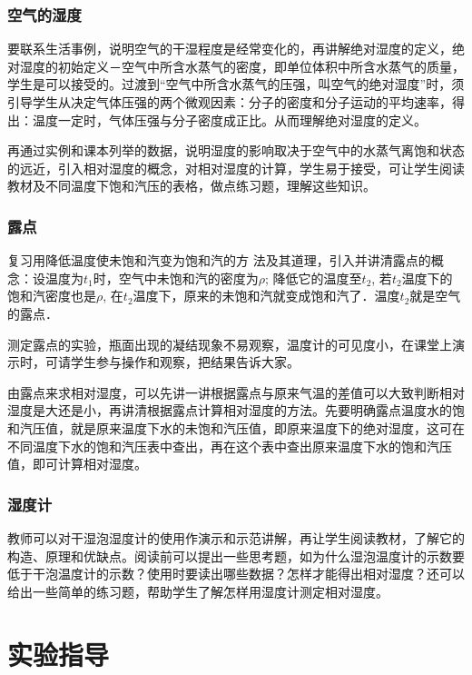 \subsubsection{空气的湿度}

要联系生活事例，说明空气的干湿程度是经常变化的，再讲解绝对湿度的定义，绝对湿度的初始定义－空气中所含水蒸气的密度，即单位体积中所含水蒸气的质量，学生是可以接受的。过渡到“空气中所含水蒸气的压强，叫空气的绝对湿度”时，须引导学生从决定气体压强的两个微观因素：分子的密度和分子运动的平均速率，得出：温度一定时，气体压强与分子密度成正比。从而理解绝对湿度的定义。

再通过实例和课本列举的数据，说明湿度的影响取决于空气中的水蒸气离饱和状态的远近，引入相对湿度的概念，对相对湿度的计算，学生易于接受，可让学生阅读教材及不同温度下饱和汽压的表格，做点练习题，理解这些知识。

\subsubsection{露点}

复习用降低温度使未饱和汽变为饱和汽的方
法及其道理，引入并讲清露点的概念：设温度为$t_1$时，空气中未饱和汽的密度为$\rho$; 降低它的温度至$t_2$, 若$t_2$温度下的饱和汽密度也是$\rho$, 在$t_2$温度下，原来的未饱和汽就变成饱和汽了．温度$t_2$就是空气的露点．

测定露点的实验，瓶面出现的凝结现象不易观察，温度计的可见度小，在课堂上演示时，可请学生参与操作和观察，把结果告诉大家。

由露点来求相对湿度，可以先讲一讲根据露点与原来气温的差值可以大致判断相对湿度是大还是小，再讲清根据露点计算相对湿度的方法。先要明确露点温度水的饱和汽压值，就是原来温度下水的未饱和汽压值，即原来温度下的绝对湿度，这可在不同温度下水的饱和汽压表中查出，再在这个表中查出原来温度下水的饱和汽压值，即可计算相对湿度。

\subsubsection{湿度计}

教师可以对干湿泡湿度计的使用作演示和示范讲解，再让学生阅读教材，了解它的构造、原理和优缺点。阅读前可以提出一些思考题，如为什么湿泡温度计的示数要低于干泡温度计的示数？使用时要读出哪些数据？怎样才能得出相对湿度？还可以给出一些简单的练习题，帮助学生了解怎样用湿度计测定相对湿度。

\section{实验指导}

